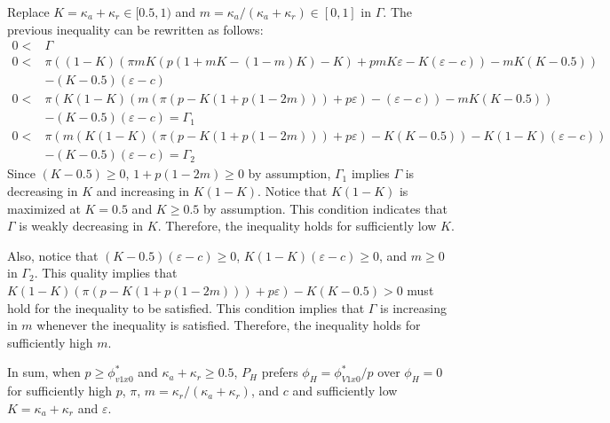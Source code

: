 \par Replace $K = \kappa_a + \kappa_r \in [0.5,1)$ and $m = \kappa_a/(\kappa_a+\kappa_r) \in [0,1]$ in $\Gamma$. The previous inequality can be rewritten as follows:
\begin{align*}
0 <& \Gamma  \\
0 <& \pi ( (1-K)(\pi mK(p(1+mK-(1-m)K)-K)+pmK\varepsilon-K(\varepsilon-c)) - mK(K-0.5) ) \\ &- (K-0.5)(\varepsilon-c) \\
0 <&\pi( K(1-K)(m(\pi(p-K(1+p(1-2m))) + p\varepsilon) - (\varepsilon-c)) - mK(K-0.5)) \\ &- (K-0.5)(\varepsilon-c) = \Gamma_{1}\\
0 <&\pi( m(K(1-K)(\pi(p-K(1+p(1-2m))) + p\varepsilon) - K(K-0.5)) - K(1-K)(\varepsilon-c) ) \\ &- (K-0.5)(\varepsilon-c) = \Gamma_{2}
\end{align*}
\noindent Since $(K-0.5)\geq0$, $1+p(1-2m)\geq 0$ by assumption, $\Gamma_{1}$ implies $\Gamma$ is decreasing in $K$ and increasing in $K(1-K)$. Notice that $K(1-K)$ is maximized at $K=0.5$ and $K\geq0.5$ by assumption. This condition indicates that $\Gamma$ is weakly decreasing in $K$. Therefore, the inequality holds for sufficiently low $K$. 

\par Also, notice that $(K-0.5)(\varepsilon-c)\geq0$, $K(1-K)(\varepsilon-c)\geq 0$, and $m\geq0$ in $\Gamma_2$. This quality implies that $K(1-K)(\pi(p-K(1+p(1-2m))) + p\varepsilon) - K(K-0.5)>0$ must hold for the inequality to be satisfied. This condition implies that $\Gamma$ is increasing in $m$ whenever the inequality is satisfied. Therefore, the inequality holds for sufficiently high $m$.

\par In sum, when $p \geq \phi^*_{v1x0}$ and $\kappa_a+\kappa_r \geq 0.5$, $P_H$ prefers $\phi_H=\phi^*_{V1x0}/p$ over $\phi_H=0$ for sufficiently high $p$, $\pi$, $m = \kappa_r/(\kappa_a+\kappa_r)$, and $c$ and sufficiently low $K = \kappa_a + \kappa_r$ and $\varepsilon$. 

